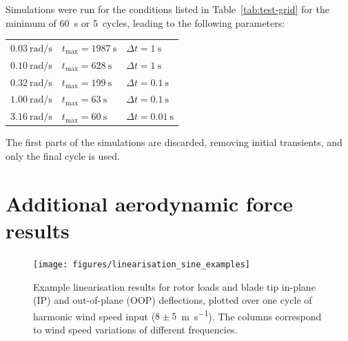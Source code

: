 \documentclass[a4paper,preprint]{elsarticle}
\newcommand{\mathup}{\mathrm}
\begin{document}
Simulations were run for the conditions listed in Table~\ref{tab:test-grid} for
the minimum of \SI{60}{\second} or \num{5}~cycles, leading to the following
parameters:

{ \centering
  \begin{tabular}{lll}
    $\SI{0.03}{\radian\per\second}$ &
    $t_{\mathup{max}} = \SI{1987}{\second}$ &
    $\Delta t = \SI{1}{\second}$ \\
    $\SI{0.10}{\radian\per\second}$ &
    $t_{\mathup{max}} = \SI{628}{\second}$ &
    $\Delta t = \SI{1}{\second}$ \\
    $\SI{0.32}{\radian\per\second}$ &
    $t_{\mathup{max}} = \SI{199}{\second}$ &
    $\Delta t = \SI{0.1}{\second}$ \\
    $\SI{1.00}{\radian\per\second}$ &
    $t_{\mathup{max}} = \SI{63}{\second}$ &
    $\Delta t = \SI{0.1}{\second}$ \\
    $\SI{3.16}{\radian\per\second}$ &
    $t_{\mathup{max}} = \SI{60}{\second}$ &
    $\Delta t = \SI{0.01}{\second}$ \\
  \end{tabular} \par
}
The first parts of the simulations are discarded, removing initial
transients, and only the final cycle is used. 

\section{Additional aerodynamic force results}
\label{sec:appendix-aero-force}

\begin{figure}
  \centering
  \hspace*{-1.5cm}\texttt{[image: figures/linearisation\_sine\_examples]}
  \caption{Example linearisation results for rotor loads and blade tip
    in-plane (IP) and out-of-plane (OOP) deflections, plotted over one
    cycle of harmonic wind speed input
    ($8\pm5$~\si{\metre\per\second}). The columns correspond to wind
    speed variations of different frequencies.}
\label{fig:hlin-example-sinusoids}
\end{figure}
\end{document}
